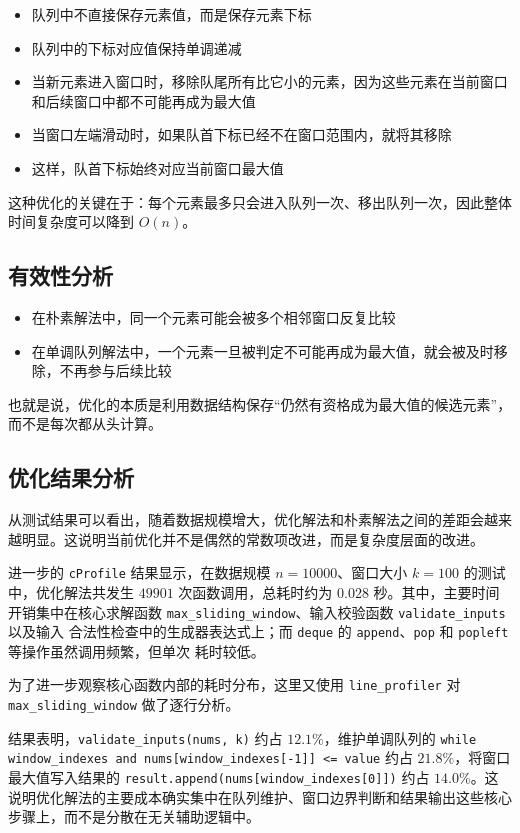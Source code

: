 \documentclass[a4paper,UTF8,fontset=none]{ctexart}
\begin{document}
\begin{itemize}
    \item 队列中不直接保存元素值，而是保存元素下标
    \item 队列中的下标对应值保持单调递减
    \item 当新元素进入窗口时，移除队尾所有比它小的元素，因为这些元素在当前窗口和后续窗口中都不可能再成为最大值
    \item 当窗口左端滑动时，如果队首下标已经不在窗口范围内，就将其移除
    \item 这样，队首下标始终对应当前窗口最大值
\end{itemize}

这种优化的关键在于：每个元素最多只会进入队列一次、移出队列一次，因此整体时间复杂度可以降到 $O(n)$。

\subsection{有效性分析}

\begin{itemize}
    \item 在朴素解法中，同一个元素可能会被多个相邻窗口反复比较
    \item 在单调队列解法中，一个元素一旦被判定不可能再成为最大值，就会被及时移除，不再参与后续比较
\end{itemize}

也就是说，优化的本质是利用数据结构保存“仍然有资格成为最大值的候选元素”，而不是每次都从头计算。

\subsection{优化结果分析}

从测试结果可以看出，随着数据规模增大，优化解法和朴素解法之间的差距会越来越明显。这说明当前优化并不是偶然的常数项改进，而是复杂度层面的改进。

进一步的 \texttt{cProfile} 结果显示，在数据规模 $n=10000$、窗口大小 $k=100$ 的测试中，优化解法共发生 $49901$ 次函数调用，总耗时约为
$0.028$ 秒。其中，主要时间开销集中在核心求解函数 \texttt{max\_sliding\_window}、输入校验函数 \texttt{validate\_inputs} 以及输入
合法性检查中的生成器表达式上；而 \texttt{deque} 的 \texttt{append}、\texttt{pop} 和 \texttt{popleft} 等操作虽然调用频繁，但单次
耗时较低。

为了进一步观察核心函数内部的耗时分布，这里又使用 \texttt{line\_profiler} 对 \texttt{max\_sliding\_window} 做了逐行分析。

结果表明，\texttt{validate\_inputs(nums, k)} 约占 $12.1\%$，维护单调队列的 \texttt{while window\_indexes and nums[window\_indexes[-1]] <= value} 约占 $21.8\%$，将窗口最大值写入结果的 \texttt{result.append(nums[window\_indexes[0]])} 约占 $14.0\%$。这说明优化解法的主要成本确实集中在队列维护、窗口边界判断和结果输出这些核心步骤上，而不是分散在无关辅助逻辑中。
\end{document}

